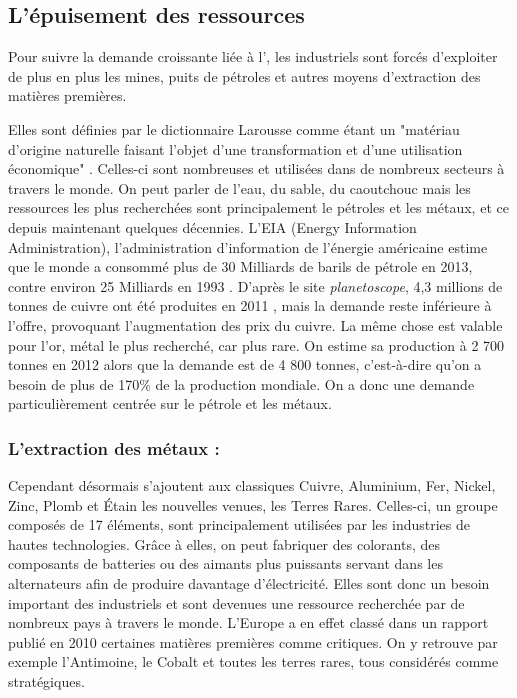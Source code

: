 \subsection{L’épuisement des ressources}

Pour suivre la demande croissante liée à l'\op, les industriels sont forcés d'exploiter de plus en plus les mines, puits de pétroles et autres moyens d'extraction des matières premières.

\bigbreak Elles sont définies par le dictionnaire Larousse comme étant un "matériau d'origine naturelle faisant l'objet d'une transformation et d'une utilisation économique" \cite{LarousseMatiere1eres}. Celles-ci sont nombreuses et utilisées dans de nombreux secteurs à travers le monde. On peut parler de l'eau, du sable, du caoutchouc mais les ressources les plus recherchées sont principalement le pétroles et les métaux, et ce depuis maintenant quelques décennies. L'EIA (Energy Information Administration), l'administration d'information de l'énergie américaine estime que le monde a consommé plus de 30 Milliards de barils de pétrole en 2013, contre environ 25 Milliards en 1993 \cite{EAI}. D'après le site \textit{planetoscope}, 4,3 millions de tonnes de cuivre ont été produites en 2011 \cite{planetoscopeOrCuivre}, mais la demande reste inférieure à l'offre, provoquant l'augmentation des prix du cuivre. La même chose est valable pour l'or, métal le plus recherché, car plus rare. On estime sa production à 2 700 tonnes en 2012 alors que la demande est de 4 800 tonnes, c'est-à-dire qu'on a besoin de plus de 170\% de la production mondiale. On a donc une demande particulièrement centrée sur le pétrole et les métaux.


\subsubsection{L'extraction des métaux : }

Cependant désormais s'ajoutent aux classiques Cuivre, Aluminium, Fer, Nickel, Zinc, Plomb et Étain les nouvelles venues, les Terres Rares. Celles-ci, un groupe composés de 17 éléments, sont principalement utilisées par les industries de hautes technologies. Grâce à elles, on peut fabriquer des colorants, des composants de batteries ou des aimants plus puissants servant dans les alternateurs afin de produire davantage d’électricité. Elles sont donc un besoin important des industriels et sont devenues une ressource recherchée par de nombreux pays à travers le monde. L'Europe a en effet classé dans un rapport publié en 2010 \cite{RapportEuropeenTerresRares} certaines matières premières comme critiques. On y retrouve par exemple l'Antimoine, le Cobalt et toutes les terres rares, tous considérés comme stratégiques.

